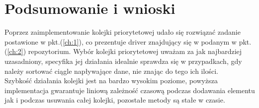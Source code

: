 \documentclass[12pt]{article}
\begin{document}
\section{Podsumowanie i wnioski}

Poprzez zaimplementowanie kolejki priorytetowej udało się rozwiązać zadanie postawione w pkt.(\ref{ch:1}), co 
prezentuje driver znajdujący się w podanym w pkt.(\ref{ch:2}) repozytorium. Wybór kolejki priorytetowej uważam za jak najbardziej 
uzasadniony, specyfika jej działania idealnie sprawdza się w przypadkach, gdy należy sortować ciągle napływające dane, nie znając do tego ich ilości.\\

Szybkość działania kolejki jest na bardzo wysokim poziome, powyższa implementacja gwarantuje liniową zależność 
czasową podczas dodawania elementu jak i podczas usuwania całej kolejki, pozostałe metody są stałe w czasie. 
\end{document}
